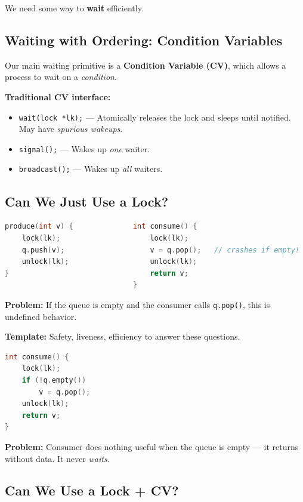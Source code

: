 \documentclass[11pt]{article}
\begin{document}
We need some way to \textbf{wait} efficiently.

\subsection{Waiting with Ordering: Condition Variables}

Our main waiting primitive is a \textbf{Condition Variable (CV)}, which allows a process to wait on a \emph{condition}.

\textbf{Traditional CV interface:}
\begin{itemize}
    \item \texttt{wait(lock *lk);} --- Atomically releases the lock and sleeps until notified. May have \emph{spurious wakeups}.
    \item \texttt{signal();} --- Wakes up \emph{one} waiter.
    \item \texttt{broadcast();} --- Wakes up \emph{all} waiters.
\end{itemize}

\subsection{Can We Just Use a Lock?}

\begin{lstlisting}[language=C, caption={Attempt 1: Lock only (BROKEN)}]
produce(int v) {              int consume() {
    lock(lk);                     lock(lk);
    q.push(v);                    v = q.pop();   // crashes if empty!
    unlock(lk);                   unlock(lk);
}                                 return v;
                              }
\end{lstlisting}

\textbf{Problem:} If the queue is empty and the consumer calls \texttt{q.pop()}, this is undefined behavior. 

\textbf{Template: } Safety, liveness, efficiency to answer these questions.

\begin{lstlisting}[language=C, caption={Attempt 2: Lock with empty check (still BROKEN)}]
int consume() {
    lock(lk);
    if (!q.empty())
        v = q.pop();
    unlock(lk);
    return v;
}
\end{lstlisting}

\textbf{Problem:} Consumer does nothing useful when the queue is empty --- it returns without data. It never \emph{waits}.

\subsection{Can We Use a Lock + CV?}
\end{document}
